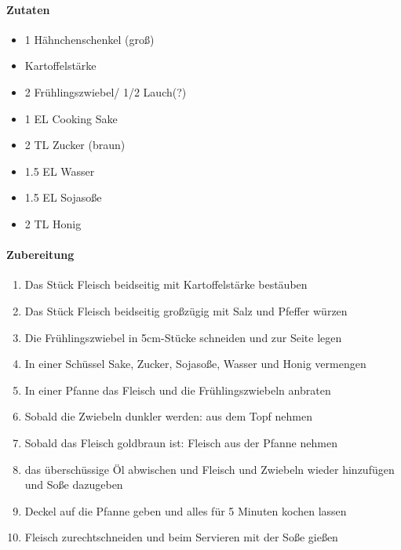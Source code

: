 \newpage
{}
\paragraph{Zutaten}
\begin{itemize}[noitemsep]
	\item 1 Hähnchenschenkel (groß)
	\item Kartoffelstärke
	\item 2 Frühlingszwiebel/ 1/2 Lauch(?)
	\item 1 EL Cooking Sake
	\item 2 TL Zucker (braun)
	\item 1.5 EL Wasser
	\item 1.5 EL Sojasoße
	\item 2 TL Honig
\end{itemize}
\paragraph{Zubereitung}
\begin{enumerate}[noitemsep]
	\item Das Stück Fleisch beidseitig mit Kartoffelstärke bestäuben 
	\item Das Stück Fleisch beidseitig großzügig mit Salz und Pfeffer würzen 
	\item Die Frühlingszwiebel in 5cm-Stücke schneiden und zur Seite legen 
	\item In einer Schüssel Sake, Zucker, Sojasoße, Wasser und Honig vermengen
	\item In einer Pfanne das Fleisch und die Frühlingszwiebeln anbraten
	\item Sobald die Zwiebeln dunkler werden: aus dem Topf nehmen
	\item Sobald das Fleisch goldbraun ist: Fleisch aus der Pfanne nehmen
	\item das überschüssige Öl abwischen und Fleisch und Zwiebeln wieder hinzufügen und Soße dazugeben
	\item Deckel auf die Pfanne geben und alles für 5 Minuten kochen lassen 
	\item Fleisch zurechtschneiden und beim Servieren mit der Soße gießen
\end{enumerate}
